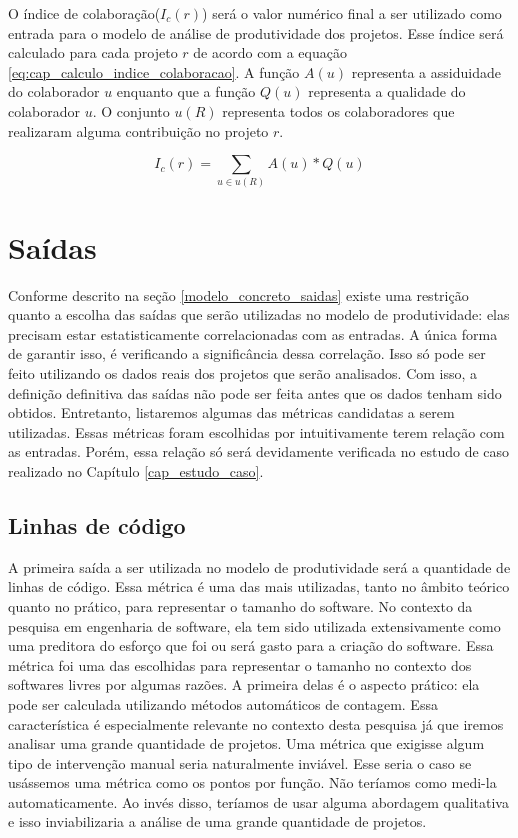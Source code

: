 O índice de colaboração($I_c(r)$) será o valor numérico final a ser utilizado como entrada para o modelo de análise de produtividade dos projetos.  Esse índice será calculado para cada projeto $r$ de acordo com a equação \ref{eq:cap_calculo_indice_colaboracao}. A função $A(u)$ representa a assiduidade do colaborador $u$ enquanto que a função $Q(u)$ representa a qualidade do colaborador $u$. O conjunto $u(R)$ representa todos os colaboradores que realizaram alguma contribuição no projeto $r$.


\begin{equation}
\label{eq:cap_calculo_indice_colaboracao}
I_c(r) =  \sum_{u  \in u(R) } A(u) * Q(u)
\end{equation}

\section{Saídas}
\label{secao_modelo_concreto_saidas}

Conforme descrito na seção \ref{modelo_concreto_saidas} existe uma restrição quanto a escolha das saídas que serão utilizadas no modelo de produtividade: elas precisam estar estatisticamente correlacionadas com as entradas. A única forma de garantir isso, é verificando a significância dessa correlação. Isso só pode ser feito utilizando os dados reais dos projetos que serão analisados. Com isso, a definição definitiva das saídas não pode ser feita antes que os dados tenham sido obtidos. Entretanto, listaremos algumas das métricas candidatas a serem utilizadas. Essas métricas foram escolhidas por intuitivamente terem relação com as entradas. Porém, essa relação só será devidamente verificada no estudo de caso realizado no Capítulo \ref{cap_estudo_caso}. 

\subsection{Linhas de código}


A primeira saída a ser utilizada no modelo de produtividade será a quantidade de linhas de código. Essa métrica é uma das mais utilizadas, tanto no âmbito teórico quanto no prático, para representar o tamanho do software.  No contexto da pesquisa em engenharia de software, ela tem sido utilizada extensivamente como uma preditora do esforço que foi ou será gasto para a criação do software.  Essa métrica foi uma das escolhidas para representar o tamanho no contexto dos softwares livres por algumas razões. A primeira delas é o aspecto prático: ela pode ser calculada utilizando métodos automáticos de contagem. Essa característica é especialmente relevante no contexto desta pesquisa já que iremos analisar uma grande quantidade de projetos. Uma métrica que exigisse algum tipo de intervenção manual seria naturalmente inviável. Esse seria o caso se usássemos uma métrica como os pontos por função. Não teríamos como medi-la automaticamente. Ao invés disso, teríamos de usar alguma abordagem qualitativa e isso inviabilizaria a análise de uma grande quantidade de projetos. 

